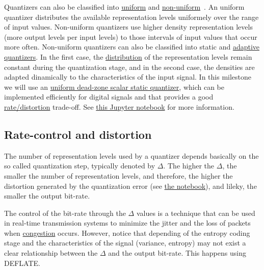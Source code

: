 Quantizers can also be classified into
\href{https://en.wikipedia.org/wiki/Quantization_(signal_processing)#Mid-riser_and_mid-tread_uniform_quantizers}{uniform}
and
\href{https://nptel.ac.in/content/storage2/courses/117104069/chapter_5/5_5.html}{non-uniform}~\cite{sayood2017introduction,vetterli2014foundations}. An
uniform quantizer distributes the available representation levels
uniformely over the range of input values. Non-uniform quantizers use
higher density representation levels (more output levels per input
levels) to those intervals of input values that occur
more often. Non-uniform quantizers can also be classified into static
and
\href{https://en.wikipedia.org/wiki/Adaptive_differential_pulse-code_modulation}{adaptive
  quantizers}. In the first case, the
\href{https://en.wikipedia.org/wiki/Probability_distribution}{distribution}
of the representation levels remain constant during the quantization
stage, and in the second case, the densities are adapted dinamically
to the characteristics of the input signal. In this milestone we will
use an
\href{https://en.wikipedia.org/wiki/Quantization_(signal_processing)#Dead-zone_quantizers}{uniform
  dead-zone scalar static quantizer}, which can be implemented
efficiently for digital signals and that provides a good
\href{https://en.wikipedia.org/wiki/Rate%E2%80%93distortion_theory}{rate/distortion}
trade-off. See \href{https://github.com/vicente-gonzalez-ruiz/quantization/blob/master/digital_quantization.ipynb}{this Jupyter notebook} for more information.

\subsection{Rate-control and distortion}
The number of representation levels used by a quantizer depends
basically on the so called quantization step, typically denoted by
$\Delta$. The higher the $\Delta$, the smaller the number of
representation levels, and therefore, the higher the distortion
generated by the quantization error (see
\href{https://github.com/vicente-gonzalez-ruiz/quantization/blob/master/digital_quantization.ipynb}{the
  notebook}), and lileky, the smaller the output bit-rate.

The control of the bit-rate through the $\Delta$ values is a technique
that can be used in real-time transmission systems to minimize the
jitter and the loss of packets when
\href{https://en.wikipedia.org/wiki/Network_congestion}{congestion}
occurs. However, notice that depending of the entropy coding stage and
the characteristics of the signal (variance, entropy) may not exist a
clear relationship between the $\Delta$ and the output bit-rate. This
happens using DEFLATE.

